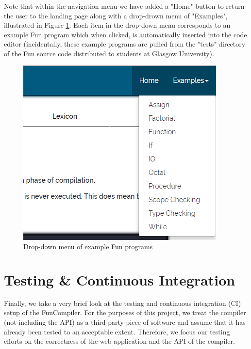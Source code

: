 \documentclass{l4proj}
\begin{document}
Note that within the navigation menu we have added a "Home" button to return the user to the landing page along with a drop-drown menu of "Examples", illustrated in Figure \ref{fig:implexamples}. Each item in the drop-down menu corresponds to an example Fun program which when clicked, is automatically inserted into the code editor (incidentally, these example programs are pulled from the "tests" directory of the Fun source code distributed to students at Glasgow University).
\begin{figure}[h]
\centering
\includegraphics[scale=0.5]{images/implexamples.PNG}
\caption{Drop-down menu of example Fun programs}
\label{fig:implexamples}	
\end{figure}

\section{Testing \& Continuous Integration}
Finally, we take a very brief look at the testing and continuous integration (CI) setup of the FunCompiler. For the purposes of this project, we treat the compiler (not including the API) as a third-party piece of software and assume that it has already been tested to an acceptable extent. Therefore, we focus our testing efforts on the correctness of the web-application and the API of the compiler. 
\end{document}
